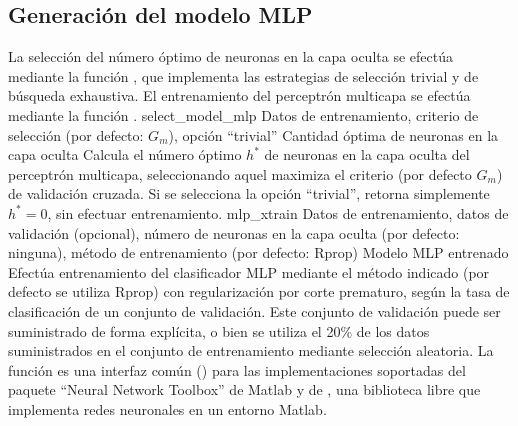 %
%
\subsection{Generación del modelo MLP}
%
La selección del número óptimo de neuronas en la capa oculta se
efectúa mediante la función , que implementa
las estrategias de selección trivial y de búsqueda exhaustiva.
El entrenamiento del perceptrón multicapa se efectúa mediante la
función .
%
\funcentry
    {select\_model\_mlp}
    {Datos de entrenamiento, criterio de selección (por defecto:
      $G_m$), opción ``trivial''}
    {Cantidad óptima de neuronas en la capa oculta}
    {Calcula el número óptimo $h^*$ de neuronas en la capa oculta del
      perceptrón multicapa, seleccionando aquel maximiza el criterio
      (por defecto $G_m$) de validación cruzada.
      Si se selecciona la opción ``trivial'', retorna simplemente
      $h^*=0$, sin efectuar entrenamiento.}
%
\funcentry
    {mlp\_xtrain}
    {Datos de entrenamiento, datos de validación (opcional), número de
      neuronas en la capa oculta (por defecto: ninguna), método de
      entrenamiento (por defecto: Rprop)}
    {Modelo MLP entrenado}
    {Efectúa entrenamiento del clasificador MLP mediante el método
      indicado (por defecto se utiliza Rprop) con regularización por
      corte prematuro, según la tasa de clasificación de un conjunto
      de validación. Este conjunto de validación puede ser
      suministrado de forma explícita, o bien se utiliza el 20\% de
      los datos suministrados en el conjunto de entrenamiento mediante
      selección aleatoria.
      La función es una interfaz común () para las
      implementaciones soportadas del paquete ``Neural Network Toolbox''
      de Matlab y de , una biblioteca libre que implementa
      redes neuronales en un entorno Matlab.}
%
